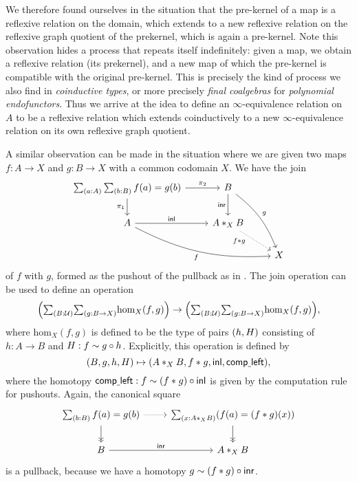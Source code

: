 We therefore found ourselves in the situation that the pre-kernel of a map is a reflexive relation on the domain, which extends to a new reflexive relation on the reflexive graph quotient of the prekernel, which is again a pre-kernel. Note this observation hides a process that repeats itself indefinitely: given a map, we obtain a reflexive relation (its prekernel), and a new map of which the pre-kernel is compatible with the original pre-kernel. This is precisely the kind of process we also find in \emph{coinductive types}, or more precisely \emph{final coalgebras} for \emph{polynomial endofunctors}. Thus we arrive at the idea to define an $\infty$-equivalence relation on $A$ to be a reflexive relation which extends coinductively to a new $\infty$-equivalence relation on its own reflexive graph quotient.

A similar observation can be made in the situation where we are given two maps $f:A\to X$ and $g:B\to X$ with a common codomain $X$. We have the join
\begin{equation*}
\begin{tikzcd}
\sm{a:A}{b:B} f(a)=g(b) \arrow[r,"\pi_2"] \arrow[d,swap,"\pi_1"] & B \arrow[d,swap,"\inr"] \arrow[ddr,bend left=15,"g"] \\
A \arrow[r,"\inl"] \arrow[drr,bend right=15,swap,"f"] & \join[X]{A}{B} \arrow[dr,densely dotted,swap,"f\ast g" near start] \\
& & X
\end{tikzcd}
\end{equation*}
of $f$ with $g$, formed as the pushout of the pullback as in \cite{joinconstruction}. The join operation can be used to define an operation
\begin{equation*}
\Big(\sm{B:\UU}{g:B\to X}\mathrm{hom}_X(f,g)\Big)\to\Big(\sm{B:\UU}{g:B\to X}\mathrm{hom}_X(f,g)\Big),
\end{equation*}
where $\mathrm{hom}_X(f,g)$ is defined to be the type of pairs ${\mathopen{}(h,H)\mathclose{}}$ consisting of $h:A \to B$ and $H:f\sim g\circ h$.
Explicitly, this operation is defined by
\begin{equation*}
\pairr{B,g,h,H} \mapsto \pairr{\join[X]{A}{B},\join{f}{g},\inl,\mathsf{comp\underline{\ }left}},
\end{equation*}
where the homotopy $\mathsf{comp\underline{\ }left}:f\sim ({f}\ast_{}{g})\circ{\mathsf{inl}}$ is given by the computation rule for pushouts.
Again, the canonical square
\begin{equation*}
\begin{tikzcd}
\sm{b:B} f(a)=g(b) \arrow[d,->>] \arrow[r,densely dotted] & \sm{x:\join[X]{A}{B}}(f(a)=(f\ast g)(x)) \arrow[d,->>] \\
B \arrow[r,"\inr"] & \join[X]{A}{B}
\end{tikzcd}
\end{equation*}
is a pullback, because we have a homotopy $g\sim (f\ast g)\circ {\mathsf{inr}}$.

